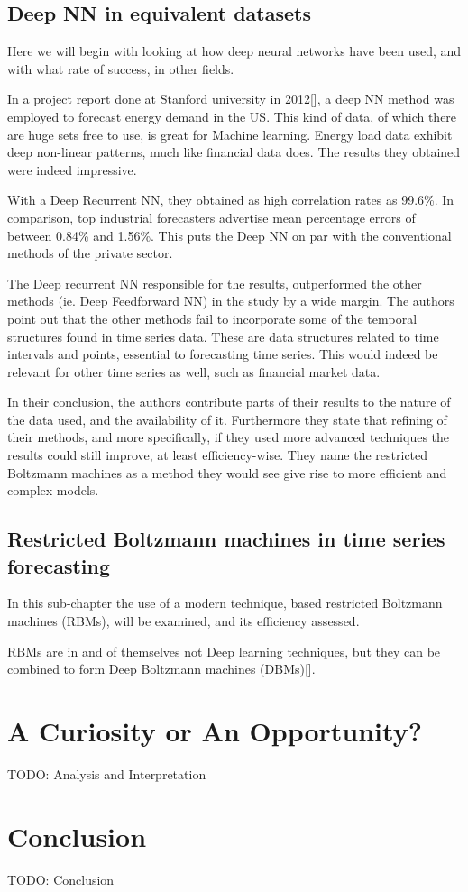 \subsection{Deep NN in equivalent datasets}
Here we will begin with looking at how deep neural networks have been used, and with what rate of success, in other fields.

In a project report done at Stanford university in 2012[], a deep NN method was employed to forecast energy demand in the US. This kind of data, of which there are huge sets free to use, is great for Machine learning. Energy load data exhibit deep non-linear patterns, much like financial data does. The results they obtained were indeed impressive.

With a Deep Recurrent NN, they obtained as high correlation rates as 99.6\%. In comparison, top industrial forecasters advertise mean percentage errors of between 0.84\% and 1.56\%. This puts the Deep NN on par with the conventional methods of the private sector.

The Deep recurrent NN responsible for the results, outperformed the other methods (ie. Deep Feedforward NN) in the study by a wide margin. The authors point out that the other methods fail to incorporate some of the temporal structures found in time series data. These are data structures related to time intervals and points, essential to forecasting time series. This would indeed be relevant for other time series as well, such as financial market data.

In their conclusion, the authors contribute parts of their results to the nature of the data used, and the availability of it. Furthermore they state that refining of their methods, and more specifically, if they used more advanced techniques the results could still improve, at least efficiency-wise. They name the restricted Boltzmann machines as a method they would see give rise to more efficient and complex models.

\subsection{Restricted Boltzmann machines in time series forecasting}

In this sub-chapter the use of a modern technique, based restricted Boltzmann machines (RBMs), will be examined, and its efficiency assessed.

RBMs are in and of themselves not Deep learning techniques, but they can be combined to form Deep Boltzmann machines (DBMs)[].





\newpage

\section{A Curiosity or An Opportunity?}
TODO: Analysis and Interpretation

\newpage

\section{Conclusion}
TODO: Conclusion

